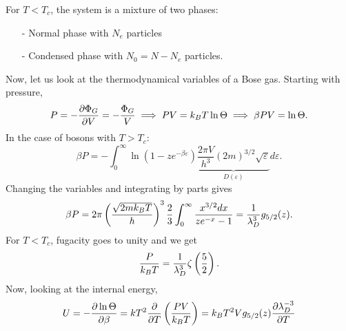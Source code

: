         For $T<T_c$, the system is a mixture of two phases:
        \begin{itemize}
            \item[-] Normal phase with $N_e$ particles 
            \item[-] Condensed phase with $N_0=N-N_e$ particles.  
        \end{itemize}
        Now, let us look at the thermodynamical variables of a Bose gas. Starting with pressure,
        \begin{equation}
            P = -\frac{\partial \Phi_G}{\partial V} = -\frac{\Phi_G}{V}\implies PV=k_BT\ln\Theta \implies \beta PV=\ln\Theta.
        \end{equation}
        In the case of bosons with $T>T_c$:
        \begin{equation}
            \beta P = -\int_{0}^{\infty}\ln(1-ze^{-\beta\varepsilon})\underbrace{\frac{2\pi V}{h^3}(2m)^{3/2}\sqrt{\varepsilon}}_{D(\varepsilon)}d\varepsilon.
        \end{equation}
        Changing the variables and integrating by parts gives
        \begin{equation}
            \beta P = 2\pi\left( \frac{\sqrt{2mk_BT}}{h} \right)^3\frac{2}{3}\int_{0}^{\infty}\frac{x^{3/2}dx}{ze^{-x}-1}=\frac{1}{\lambda_D^3}g_{5/2}(z).
        \end{equation}
        For $T<T_c$, fugacity goes to unity and we get
        \begin{equation}
            \frac{P}{k_BT}=\frac{1}{\lambda_D^3}\zeta\left( \frac{5}{2} \right).
        \end{equation}
        Now, looking at the internal energy,
        \begin{equation}
            U=-\frac{\partial \ln\Theta}{\partial \beta}=kT^2 \frac{\partial }{\partial T}\left( \frac{PV}{k_BT} \right)=k_BT^2Vg_{5/2}(z) \frac{\partial \lambda_D^{-3}}{\partial T}
        \end{equation}
\newpage
